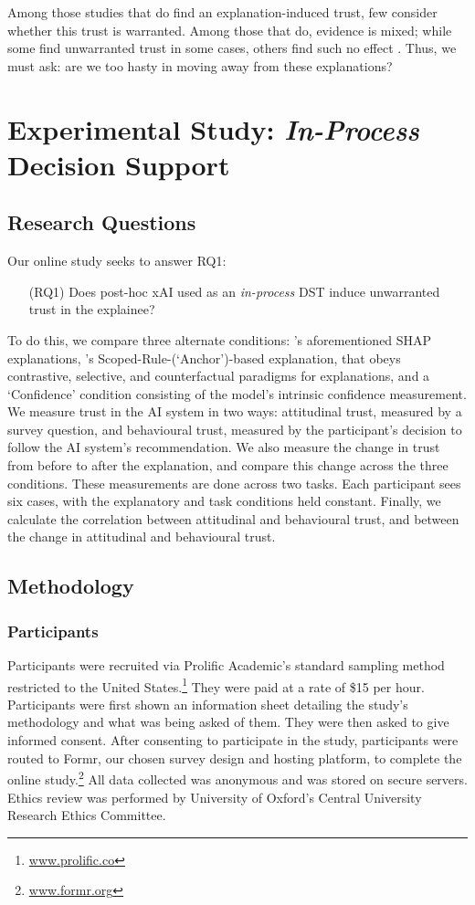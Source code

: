 Among those studies that do find an explanation-induced trust, few consider whether this trust is warranted. Among those that do, evidence is mixed; while some find unwarranted trust in some cases, others find such no effect \cite{lai_human_2019,jacobs_how_2021}. Thus, we must ask: are we too hasty in moving away from these explanations? 

\section{Experimental Study: \emph{In-Process} Decision Support}\label{sec:online}
\subsection{Research Questions}
Our online study seeks to answer RQ1:

\begin{enumerate}
    \item[(RQ1)] Does post-hoc xAI used as an \emph{in-process} DST induce unwarranted trust in the explainee?
\end{enumerate}

To do this, we compare three alternate conditions: \textcite{lundberg_unified_2017}'s aforementioned SHAP explanations, \textcite{ribeiro_anchors_2018}'s Scoped-Rule-(`Anchor')-based explanation, that obeys contrastive, selective, and counterfactual paradigms for explanations, and a `Confidence' condition consisting of the model's intrinsic confidence measurement. We measure trust in the AI system in two ways: attitudinal trust, measured by a survey question, and behavioural trust, measured by the participant's decision to follow the AI system's recommendation. We also measure the change in trust from before to after the explanation, and compare this change across the three conditions. These measurements are done across two tasks. Each participant sees six cases, with the explanatory and task conditions held constant. Finally, we calculate the correlation between attitudinal and behavioural trust, and between the change in attitudinal and behavioural trust.

\subsection{Methodology}
\subsubsection{Participants}
Participants were recruited via Prolific Academic's standard sampling method restricted to the United States.\footnote{\url{www.prolific.co}} They were paid at a rate of \$15 per hour. Participants were first shown an information sheet detailing the study's methodology and what was being asked of them. They were then asked to give informed consent. After consenting to participate in the study, participants were routed to Formr, our chosen survey design and hosting platform, to complete the online study.\footnote{\url{www.formr.org}} All data collected was anonymous and was stored on secure servers. Ethics review was performed by University of Oxford's Central University Research Ethics Committee.

